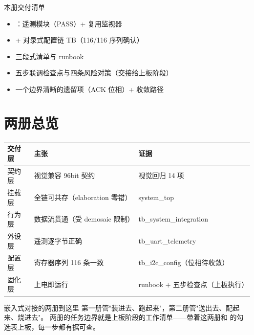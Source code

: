 \begin{okbox}{本册交付清单}
\begin{itemize}
  \item {}：遥测模块（PASS）+ 复用监视器
  \item {} + 对录式配置链 TB（116/116 序列确认）
  \item {} 三段式清单与  runbook
  \item 五步联调检查点与四条风险对策（交接给上板阶段）
  \item 一个边界清晰的遗留项（ACK 位相）+ 收敛路径
\end{itemize}
\end{okbox}

\section{两册总览}

\begin{center}
\begin{tabular}{lll}
\toprule
\rowcolor{rowtint}\textbf{交付层} & \textbf{主张} & \textbf{证据} \\
\midrule
契约层 & 视觉兼容 96bit 契约 & 视觉回归 14 项 \\
挂载层 & 全链可共存（elaboration 零错） & system\_top \\
行为层 & 数据流贯通（受 demosaic 限制） & tb\_system\_integration \\
外设层 & 遥测逐字节正确 & tb\_uart\_telemetry \\
配置层 & 寄存器序列 116 条一致 & tb\_i2c\_config（位相待收敛） \\
固化层 & 上电即运行 & runbook + 五步检查点（上板执行） \\
\bottomrule
\end{tabular}
\end{center}

\begin{tipbox}{嵌入式对接的两册到这里}
第一册管"装进去、跑起来"，第二册管"送出去、配起来、烧进去"。
两册的任务边界就是上板阶段的工作清单——带着这两册和
 的勾选表上板，每一步都有据可查。
\end{tipbox}
